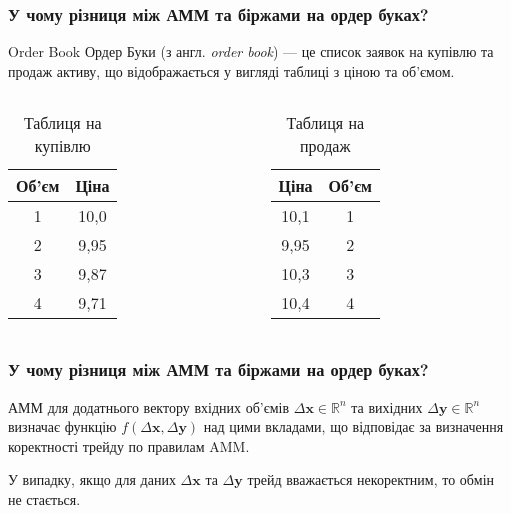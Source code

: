 \documentclass[beamer]{standalone}
\begin{document}
\begin{frame}\frametitle{У чому різниця між АММ та біржами на ордер буках?}
  \begin{block}{Order Book}
    Ордер Буки (з англ. \textit{order book}) --- це список заявок на купівлю та
    продаж активу, що відображається у вигляді таблиці з ціною та об'ємом.
  \end{block}
  \begin{columns}
    \begin{table}
      \begin{tabular}{ c | c }
        Об'єм & Ціна \\
        \hline \hline
        1 & 10,0 \\
        \rowcolor{red} 2 & 9,95 \\
        3 & 9,87 \\
        4 & 9,71
      \end{tabular}
      \caption{Таблиця на купівлю}
    \end{table}
    \begin{table}
      \begin{tabular}{ c | c }
        Ціна & Об'єм \\
        \hline \hline
        10,1 & 1 \\
        \rowcolor{green} 9,95 & 2 \\
        10,3 & 3 \\
        10,4 & 4
      \end{tabular}
      \caption{Таблиця на продаж}
    \end{table}
  \end{columns}
\end{frame}

\begin{frame}\frametitle{У чому різниця між АММ та біржами на ордер буках?}
  АММ для додатнього вектору вхідних об'ємів $\Delta \mathbf{x} \in \mathbb{R}^{n}$ та
  вихідних $\Delta \mathbf{y} \in \mathbb{R}^{n}$ визначає функцію
  $f(\Delta \mathbf{x}, \Delta \mathbf{y})$ над цими вкладами, що відповідає за визначення
  коректності трейду по правилам AMM.

  У випадку, якщо для даних $\Delta \mathbf{x}$ та $\Delta \mathbf{y}$ трейд вважається
  некоректним, то обмін не стається.
\end{frame}
\end{document}
